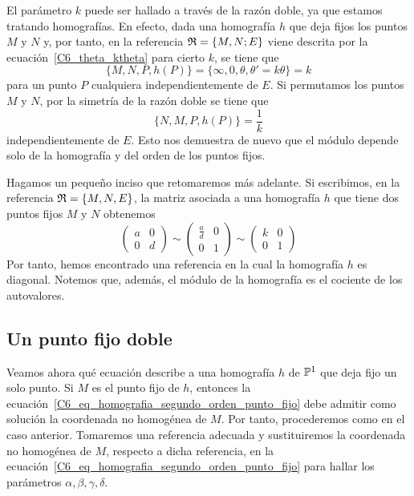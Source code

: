 El parámetro $k$ puede ser hallado a través de la razón doble, ya que estamos tratando homografías. En efecto, dada una homografía $h$ que deja fijos los puntos $M$ y $N$ y, por tanto, en la referencia $\mathfrak{R}=\{M,N;E\}$ viene descrita por la ecuación~\eqref{C6_theta_ktheta} para cierto $k$, se tiene que
\begin{equation}
	\{M,N,P,h(P)\}=\{\infty,0,\theta,\theta'=k\theta\}=k
\end{equation}
para un punto $P$ cualquiera independientemente de $E$. Si permutamos los puntos $M$ y $N$, por la simetría de la razón doble se tiene que
\begin{equation}
	\{N,M,P,h(P)\}=\frac{1}{k}
\end{equation}
independientemente de $E$. Esto nos demuestra de nuevo que el módulo depende solo de la homografía y del orden de los puntos fijos.

Hagamos un pequeño inciso que retomaremos más adelante. Si escribimos, en la referencia $\mathfrak{R}=\{M,N,E\}$, la matriz asociada a una homografía $h$ que tiene dos puntos fijos $M$ y $N$ obtenemos
\begin{equation*}
	\left( \begin{array}{cc}
	a&0\\
	0&d
	\end{array}\right) 
	\sim \left( \begin{array}{cc}
	\frac{a}{d}&0\\
	0&1
	\end{array}\right) 
	\sim \left( \begin{array}{cc}
	k&0\\
	0&1
	\end{array}\right)
\end{equation*}
Por tanto, hemos encontrado una referencia en la cual la homografía $h$ es diagonal. Notemos que, además, el módulo de la homografía es el cociente de los autovalores.

\subsection{Un punto fijo doble}
Veamos ahora qué ecuación describe a una homografía $h$ de $\mathbb{P}^1$ que deja fijo un solo punto. Si $M$ es el punto fijo de $h$, entonces la ecuación~\eqref{C6_eq_homografia_segundo_orden_punto_fijo} debe admitir como solución la coordenada no homogénea de $M$. Por tanto, procederemos como en el caso anterior. Tomaremos una referencia adecuada y sustituiremos la coordenada no homogénea de $M$, respecto a dicha referencia, en la ecuación~\eqref{C6_eq_homografia_segundo_orden_punto_fijo} para hallar los parámetros $\alpha, \beta,\gamma,\delta$.

